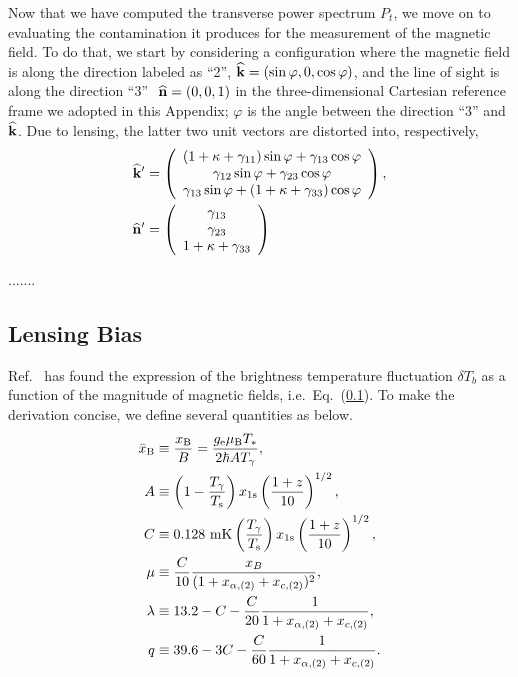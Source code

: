 Now that we have computed the transverse power spectrum $P_t$, we move on to evaluating the contamination it produces for the measurement of the magnetic field. To do that, we start by considering a configuration where the magnetic field is along the direction labeled as ``2'', ${\bf{\widehat k}}=(\sin\varphi,0,\cos\varphi)$, and the line of sight is along the direction ``3'' $\ {\bf{\widehat n}}=(0,0,1)$ in the three-dimensional Cartesian reference frame we adopted in this Appendix; $\varphi$ is the angle between the direction ``3'' and ${\bf{\widehat k}}$. Due to lensing, the latter two unit vectors are distorted into, respectively,
\begin{align}
{\bf{\widehat k}}'&=\left(\begin{array}{c}
(1+\kappa+\gamma_{11})\sin\varphi+\gamma_{13}\cos\varphi\\
\gamma_{12}\sin\varphi+\gamma_{23}\cos\varphi\\
\gamma_{13}\sin\varphi+(1+\kappa+\gamma_{33})\cos\varphi
\end{array}\right),\nonumber\\
{\bf{\widehat n}}'&=\left(\begin{array}{c}
\gamma_{13}\\
\gamma_{23}\\
1+\kappa+\gamma_{33}
\end{array}\right)
\label{eq:distorted_kn}
\end{align}





.......

\subsection{Lensing Bias}
Ref.~\cite{Venumadhav:2014tqa} has found the expression of the brightness temperature fluctuation $\delta T_b$ as a function of the magnitude of magnetic fields, i.e.~Eq.~(\ref{}). To make the derivation concise, we define several quantities as below.
\begin{align}
\bar{x}_{\rm B}&\equiv\frac{x_{\rm B}}{B} = \frac{g_{\rm e} \mu_{\rm B} T_*}{2 \hbar A T_\gamma},\\
A&\equiv\left( 1 - \frac{T_\gamma}{T_{\rm s}} \right) x_{1{\rm s}} \left( \frac{1+z}{10} \right)^{1/2},\\
C&\equiv0.128 \ {\rm mK} \left( \frac{T_\gamma}{T_{\rm s}} \right) x_{1{\rm s}} \left( \frac{1+z}{10} \right)^{1/2},\\
\mu&\equiv\frac{C}{10}\frac{x_B}{(1+x_{\alpha,(2)}+x_{c,(2)})^2},\\
\lambda&\equiv 13.2-C-\frac{C}{20}\frac{1}{1+x_{\alpha,(2)}+x_{c,(2)}},\\
q&\equiv 39.6-3C-\frac{C}{60}\frac{1}{1+x_{\alpha,(2)}+x_{c,(2)}}.
\end{align}


